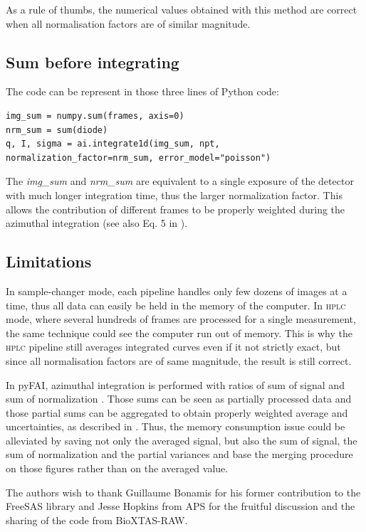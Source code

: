 \documentclass[preprint]{iucr}              %
\begin{document}
As a rule of thumbs, the numerical values obtained with this method are correct when all normalisation factors are of similar magnitude.

\subsection{Sum before integrating}
The code can be represent in those three lines of Python code:
\begin{verbatim} 
img_sum = numpy.sum(frames, axis=0)
nrm_sum = sum(diode)
q, I, sigma = ai.integrate1d(img_sum, npt, normalization_factor=nrm_sum, error_model="poisson")
\end{verbatim}

The \textit{img\_sum} and \textit{nrm\_sum} are equivalent to a single exposure of the detector with much longer integration time, thus the larger normalization factor. 
This allows the contribution of different frames to be properly weighted during the azimuthal integration (see also Eq. 5 in ). 


\subsection{Limitations}
In sample-changer mode, each pipeline handles only few dozens of images at a time, thus all data can easily be held in the memory of the computer.
In \textsc{hplc} mode, where several hundreds of frames are processed for a single measurement, the same technique could see the computer run out of memory.
This is why the \textsc{hplc} pipeline still averages integrated curves even if it not strictly exact, but since all normalisation factors are of same magnitude, the result is still correct.  

In pyFAI, azimuthal integration is performed with ratios of sum of signal and sum of normalization \cite{pyfai_2020}.
Those sums can be seen as partially processed data and those partial sums can be aggregated to obtain properly weighted average and uncertainties, as described in .
Thus, the memory consumption issue could be alleviated by saving not only the averaged signal, but also the sum of signal, the sum of normalization and the partial variances and base the merging procedure on those figures rather than on the averaged value.

The authors wish to thank Guillaume Bonamis for his former contribution to the FreeSAS library and Jesse Hopkins from APS for the fruitful discussion and the  sharing of the code from BioXTAS-RAW.



\end{document}
